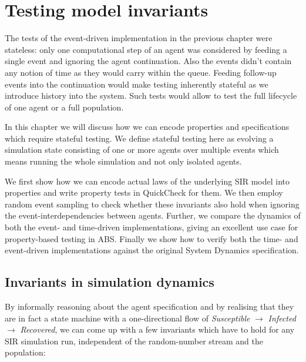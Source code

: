 \chapter{Testing model invariants}
\label{ch:sir_invariants}
The tests of the event-driven implementation in the previous chapter were stateless: only one computational step of an agent was considered by feeding a single event and ignoring the agent continuation. Also the events didn't contain any notion of time as they would carry within the queue. Feeding follow-up events into the continuation would make testing inherently stateful as we introduce history into the system. Such tests would allow to test the full lifecycle of one agent or a full population.

In this chapter we will discuss how we can encode properties and specifications which require stateful testing. We define stateful testing here as evolving a simulation state consisting of one or more agents over multiple events which means running the whole simulation and not only isolated agents.

We first show how we can encode actual laws of the underlying SIR model into properties and write property tests in QuickCheck for them. We then employ random event sampling to check whether these invariants also hold when ignoring the event-interdependencies between agents. Further, we compare the dynamics of both the event- and time-driven implementations, giving an excellent use case for property-based testing in ABS. Finally we show how to verify both the time- and event-driven implementations against the original System Dynamics specification.

\section{Invariants in simulation dynamics}
\label{sec:prop_invariants_dynamics}
By informally reasoning about the agent specification and by realising that they are in fact a state machine with a one-directional flow of \textit{Susceptible} $\rightarrow$ \textit{Infected} $\rightarrow$ \textit{Recovered}, we can come up with a few invariants which have to hold for any SIR simulation run, independent of the random-number stream and the population:

